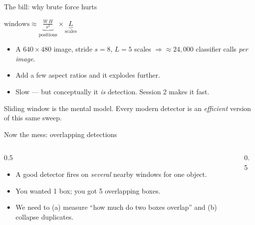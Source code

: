 \documentclass[10pt,aspectratio=169]{beamer}
\begin{document}
\begin{frame}{The bill: why brute force hurts}
  \begin{mathbox}
    $\text{windows}\approx \underbrace{\tfrac{W\,H}{s^2}}_{\text{positions}}\times \underbrace{L}_{\text{scales}}$
  \end{mathbox}
  \begin{itemize}
    \item A $640\times480$ image, stride $s{=}8$, $L{=}5$ scales $\Rightarrow \approx 24{,}000$ classifier calls \emph{per image}.
    \item Add a few aspect ratios and it explodes further.
    \item Slow --- but conceptually it \emph{is} detection. Session 2 makes it fast.
  \end{itemize}
  \begin{goodbox}
    Sliding window is the mental model. Every modern detector is an \emph{efficient} version of this same sweep.
  \end{goodbox}
\end{frame}

\begin{frame}{Now the mess: overlapping detections}
  \begin{columns}[T]
    \begin{column}{0.5\textwidth}
      \begin{itemize}
        \item A good detector fires on \emph{several} nearby windows for one object.
        \item You wanted 1 box; you got 5 overlapping boxes.
        \item We need to (a) measure ``how much do two boxes overlap'' and (b) collapse duplicates.
      \end{itemize}
    \end{column}
    \begin{column}{0.5\textwidth}
      \begin{center}
      \end{center}
    \end{column}
  \end{columns}
\end{frame}
\end{document}
